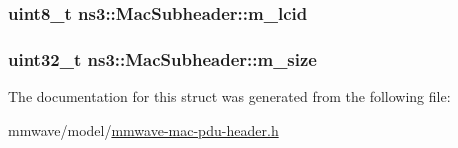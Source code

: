\subsubsection[{\texorpdfstring{m\+\_\+lcid}{m_lcid}}]{\setlength{\rightskip}{0pt plus 5cm}uint8\+\_\+t ns3\+::\+Mac\+Subheader\+::m\+\_\+lcid}\hypertarget{structns3_1_1MacSubheader_aa5d6c009a8b8b8a35a6d88aad398daa7}{}\label{structns3_1_1MacSubheader_aa5d6c009a8b8b8a35a6d88aad398daa7}
\subsubsection[{\texorpdfstring{m\+\_\+size}{m_size}}]{\setlength{\rightskip}{0pt plus 5cm}uint32\+\_\+t ns3\+::\+Mac\+Subheader\+::m\+\_\+size}\hypertarget{structns3_1_1MacSubheader_a7dbaf404c6eb63a0594b65f1343d7ec6}{}\label{structns3_1_1MacSubheader_a7dbaf404c6eb63a0594b65f1343d7ec6}


The documentation for this struct was generated from the following file\+:\begin{DoxyCompactItemize}
\item 
mmwave/model/\hyperlink{mmwave-mac-pdu-header_8h}{mmwave-\/mac-\/pdu-\/header.\+h}\end{DoxyCompactItemize}
